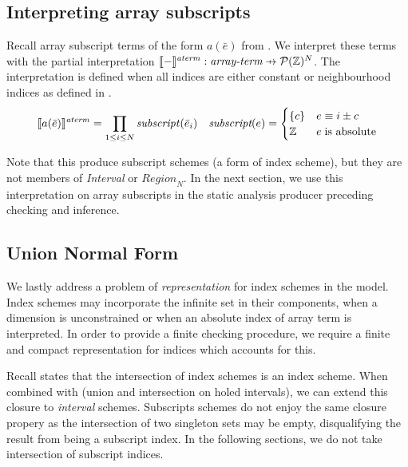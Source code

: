 \subsection{Interpreting array subscripts}
\label{sec:fromcode}

\begin{defn}
  \label{defn:subscript}
  Recall array subscript terms of the form $a(\bar{e})$ from
  . We interpret these terms with the partial
  interpretation $\interp{-}^{\mathit{aterm}} : \textit{array-term}
  \prightarrow{} \mathcal{P}(\bz{})^N$. The interpretation is defined when
  all indices are either constant or neighbourhood indices as defined in
  .
%
  \begin{align*}
    \llbracket{} {a(\bar{e})} \rrbracket{}^{\mathit{aterm}} =
      \prod_{1 \leq i \leq N} \mathit{subscript}(\bar{e}_i) & &
    \textit{subscript}(e) = \begin{cases}
      \{ c \} & e \equiv i \pm c \\
      \textnormal{$\mathbb{Z}$} & e \; \mbox{is absolute}
    \end{cases}
  \end{align*}
\end{defn}
%
Note that this produce subscript schemes (a form of index scheme), but
they are not members of \textit{Interval} or $\textit{Region}_N$. In
the next section, we use this interpretation on array subscripts in
the static analysis producer preceding checking and inference.

\subsection{Union Normal Form}\label{subsec:union-normal-form}

\noindent
We lastly address a problem of \emph{representation} for index schemes
in the model. Index schemes may incorporate the infinite set \bz{} in
their components, \eg{} when a dimension is unconstrained or when an
absolute index of array term is interpreted. In order to provide a
finite checking procedure, we require a finite and compact
representation for indices which accounts for this.

Recall  states that the
intersection of index schemes is an index scheme. When
combined with  (union and intersection
on holed intervals), we can extend this closure to \emph{interval} schemes.
Subscripts schemes do not enjoy the same closure propery as the intersection of
two singleton sets may be empty, disqualifying the result from 
being a subscript index. In the following sections, we do not take
intersection of subscript indices.

